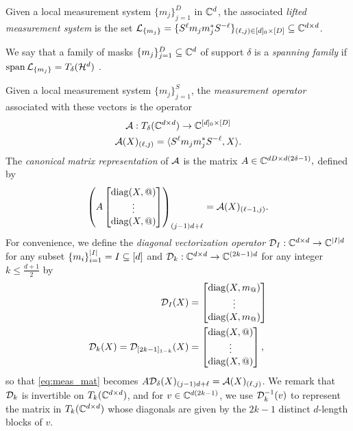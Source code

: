 \begin{definition}
  Given a local measurement system $\{m_j\}_{j = 1}^D$ in $\mathbb{C}^d$, the associated \emph{lifted measurement system} is the set $\mathcal{L}_{\{m_j\}} = \{S^{\ell} m_j m_j^* S^{- \ell}\}_{(\ell, j) \in [d]_0 \times [D]} \subseteq \mathbb{C}^{d \times d}$. \label{def:lifted_meas}
\end{definition}

\begin{definition}
  We say that a family of masks $\{m_j\}_{j = 1}^D \subseteq \mathbb{C}^d$ of support $\delta$ is a \emph{spanning family} if $\operatorname{span} \mathcal{L}_{\{m_j\}} = T_\delta(\mathcal{H}^d)$%
  . \label{def:span_fam}
\end{definition}

\begin{definition}
  Given a local measurement system $\{m_j\}_{j = 1}^S$, the \emph{measurement operator} associated with these vectors is the operator
  \begin{gather}
    \mathcal{A} : T_\delta(\mathbb{C}^{d \times d}) \to \mathbb{C}^{[d]_0 \times [D]} \nonumber \\
    \mathcal{A}(X)_{(\ell, j)} = \langle S^{\ell} m_j m_j^* S^{-\ell}, X \rangle. \label{eq:meas_op}
  \end{gather}
  The \emph{canonical matrix representation} of $\mathcal{A}$ is the matrix $A \in \mathbb{C}^{d D \times d (2 \delta - 1)},$ defined by
  \begin{equation}
    \left(A \colmatfun{\diag(X, @)}{1 - \delta}{\delta - 1}\right)_{(j - 1) d + \ell} = \Ac(X)_{(\ell - 1, j)}.
    \label{eq:meas_mat}
  \end{equation}
  For convenience, we define the \emph{diagonal vectorization operator} $\mathcal{D}_I : \mathbb{C}^{d \times d} \to \mathbb{C}^{\lvert I\rvert d}$ for any subset $\{m_i\}_{i = 1}^{\lvert I\rvert} = I \subseteq [d]$ and $\mathcal{D}_k : \mathbb{C}^{d \times d} \to \mathbb{C}^{(2 k - 1) d}$ for any integer $k \le \frac{d + 1}{2}$ by
  \begin{align}
    \Dc_I(X) &= \colmatfun{\diag(X, m_@)}{1}{\abs{I}}
    \label{eq:diag_vec_set} \\
    \Dc_k(X) = \Dc_{[2 k - 1]_{1 - k}}(X) &= \colmatfun{\diag(X, @)}{1 - k}{k - 1},
    \label{eq:diag_vec}
  \end{align}
  so that \eqref{eq:meas_mat} becomes $A \mathcal{D}_{\delta} (X)_{(j - 1) d + \ell} = \mathcal{A}(X)_{(\ell, j)}$.  We remark that $\mathcal{D}_k$ is invertible on $T_k(\mathbb{C}^{d \times d})$, and for $v \in \mathbb{C}^{d (2 k - 1)}$, we use $\mathcal{D}_k^{-1}(v)$ to represent the matrix in $T_k(\mathbb{C}^{d \times d})$ whose diagonals are given by the $2k - 1$ distinct $d$-length blocks of $v$.
\end{definition}



